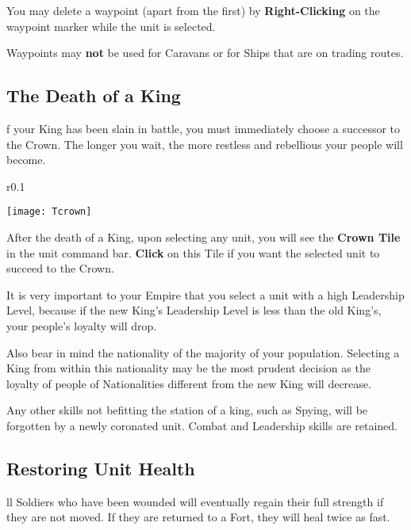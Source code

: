 You may delete a waypoint (apart from the first) by \textbf{Right-Clicking} on the waypoint marker while the unit is selected.

Waypoints may \textbf{not} be used for Caravans or for Ships that are on trading routes.

\subsection{The Death of a King}


f your King has been slain in battle, you must immediately choose a successor to the Crown. The longer you wait, the more restless and rebellious your people will become.

\begin{wrapfigure}{r}{0.1\textwidth}
    \vspace{-20pt}
    \begin{center}
        \texttt{[image: Tcrown]}
    \end{center}
    \vspace{-20pt}
\end{wrapfigure}

After the death of a King, upon selecting any unit, you will see the \textbf{Crown Tile} in the unit command bar. \textbf{Click} on this Tile if you want the selected unit to succeed to the Crown.

It is very important to your Empire that you select a unit with a high Leadership Level, because if the new King’s Leadership Level is less than the old King’s, your people’s loyalty will drop.

Also bear in mind the nationality of the majority of your population. Selecting a King from within this nationality may be the most prudent decision as the loyalty of people of Nationalities different from the new King will decrease.

Any other skills not befitting the station of a king, such as Spying, will be forgotten by a newly coronated unit. Combat and Leadership skills are retained.

\subsection{Restoring Unit Health}


ll Soldiers who have been wounded will eventually regain their full strength if they are not moved. If they are returned to a Fort, they will heal twice as fast.

